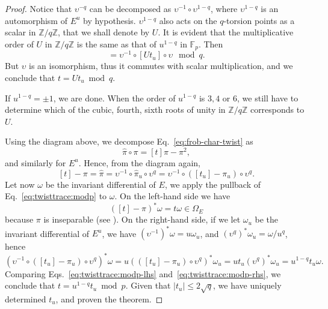\documentclass[12pt]{article}
\theoremstyle{plain}
\theoremstyle{definition}
\def\Z{\ensuremath{\mathbb{Z}}}
\def\F{\ensuremath{\mathbb{F}}}
\begin{document}
\begin{proof}
  Notice that $\upsilon^{-q}$ can be decomposed as
  $\upsilon^{-1}\circ\upsilon^{1-q}$, where $\upsilon^{1-q}$ is an
  automorphism of $E^u$ by hypothesis. $\upsilon^{1-q}$ also acts on
  the $q$-torsion points as a scalar in $\Z/q\Z$, that we shall denote
  by $U$. It is evident that the multiplicative order of $U$ in $\Z/q\Z$
  is the same as that of $u^{1-q}$ in $\F_p$. Then
  \begin{equation*}
    [t] = \upsilon^{-1}\circ[Ut_u]\circ\upsilon\mod q.
  \end{equation*}
  But $\upsilon$ is an isomorphism, thus it commutes with scalar
  multiplication, and we conclude that $t=Ut_u\bmod q$.

  If $u^{1-q}=\pm1$, we are done. When the order of $u^{1-q}$ is $3,4$
  or $6$, we still have to determine which of the cubic, fourth, sixth
  roots of unity in $\Z/q\Z$ corresponds to $U$.

  Using the diagram above, we decompose
  Eq.~\eqref{eq:frob-char-twist} as
  \begin{equation*}
    \hat\pi\circ\pi = [t]\pi - \pi^2,
  \end{equation*}
  and similarly for $E^u$. Hence, from the diagram again,
  \begin{equation}
    \label{eq:twisttrace:modp}
    [t] - \pi = \hat\pi = \upsilon^{-1}\circ\hat\pi_u\circ\upsilon^q 
    =  \upsilon^{-1}\circ([t_u] - \pi_u)\circ\upsilon^q.
  \end{equation}
  Let now $\omega$ be the invariant differential of $E$, we apply the
  pullback of Eq.~\eqref{eq:twisttrace:modp} to $\omega$. On the
  left-hand side we have
  \begin{equation}
    \label{eq:twisttrace:modp-lhs}
    ([t]-\pi)^\ast\omega = t\omega\in\Omega_E
  \end{equation}
  because $\pi$ is inseparable (see \cite[\S~5]{Sil}). On the
  right-hand side, if we let $\omega_u$ be the invariant differential
  of $E^u$, we have $(\upsilon^{-1})^\ast\omega=u\omega_u$, and
  $(\upsilon^q)^\ast\omega_u=\omega/u^q$, hence
  \begin{equation}
    \label{eq:twisttrace:modp-rhs}
    (\upsilon^{-1}\circ([t_u] - \pi_u)\circ\upsilon^q)^\ast\omega =
    u(([t_u] - \pi_u)\circ\upsilon^q)^\ast\omega_u =
    ut_u(\upsilon^q)^\ast\omega_u = u^{1-q}t_u\omega.
  \end{equation}
  Comparing Eqs.~\eqref{eq:twisttrace:modp-lhs}
  and~\eqref{eq:twisttrace:modp-rhs}, we conclude that $t = u^{1-q}t_u
  \bmod p$. Given that $\lvert t_u\rvert\le2\sqrt{q}$, we have uniquely determined $t_u$, and proven the theorem.
\end{proof}
\end{document}
